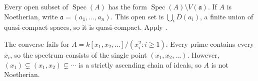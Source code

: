 Every open subset of $\operatorname{Spec}(A)$ has the form $\operatorname{Spec}(A)\setminus V(\mathfrak a)$. If $A$ is Noetherian, write $\mathfrak a=(a_1,\ldots,a_n)$. This open set is $\bigcup_iD(a_i)$, a finite union of quasi-compact spaces, so it is quasi-compact. Apply .

The converse fails for $A=k[x_1,x_2,\ldots]/(x_i^2:i\ge1)$. Every prime contains every $x_i$, so the spectrum consists of the single point $(x_1,x_2,\ldots)$. However, $(x_1)\subsetneq(x_1,x_2)\subsetneq\cdots$ is a strictly ascending chain of ideals, so $A$ is not Noetherian.

